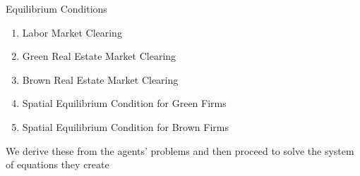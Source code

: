 \documentclass[11pt, dvipsnames, usenames]{beamer}
\begin{document}
\begin{frame}{Equilibrium Conditions}

\begin{enumerate}
	\item Labor Market Clearing
	\item Green Real Estate Market Clearing
	\item Brown Real Estate Market Clearing
	\item Spatial Equilibrium Condition for Green Firms
	\item Spatial Equilibrium Condition for Brown Firms
\end{enumerate}

\vfill
We derive these from the agents' problems and then proceed to solve the system of equations they create

\end{frame}
\end{document}
